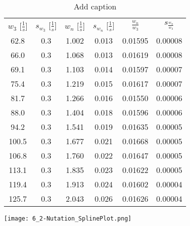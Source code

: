 \begin{table}[htbp]
    \centering
      \begin{tabular}{cccccc}
      \rowcolor[rgb]{ .741,  .843,  .933} $w_3$ [$\frac{1}{s}$] & $s_{w_3}$ [$\frac{1}{s}$] & $w_n$ [$\frac{1}{s}$] & $s_{w_n}$ [$\frac{1}{s}$] & $\frac{w_n}{w_3}$ & $s_\frac{w_n}{w_3}$  \\
      62.8  & 0.3   & 1.002 & 0.013 & 0.01595 & 0.00008 \\
      66.0  & 0.3   & 1.068 & 0.013 & 0.01619 & 0.00008 \\
      69.1  & 0.3   & 1.103 & 0.014 & 0.01597 & 0.00007 \\
      75.4  & 0.3   & 1.219 & 0.015 & 0.01617 & 0.00007 \\
      81.7  & 0.3   & 1.266 & 0.016 & 0.01550 & 0.00006 \\
      88.0  & 0.3   & 1.404 & 0.018 & 0.01596 & 0.00006 \\
      94.2  & 0.3   & 1.541 & 0.019 & 0.01635 & 0.00005 \\
      100.5 & 0.3   & 1.677 & 0.021 & 0.01668 & 0.00005 \\
      106.8 & 0.3   & 1.760 & 0.022 & 0.01647 & 0.00005 \\
      113.1 & 0.3   & 1.835 & 0.023 & 0.01622 & 0.00005 \\
      119.4 & 0.3   & 1.913 & 0.024 & 0.01602 & 0.00004 \\
      125.7 & 0.3   & 2.043 & 0.026 & 0.01626 & 0.00004 \\
      \end{tabular}%
    \label{tab:addlabel}%
    \caption{Add caption}
\end{table}%

\begin{center}
    \texttt{[image: 6\_2-Nutation\_SplinePlot.png]}
\end{center}
  